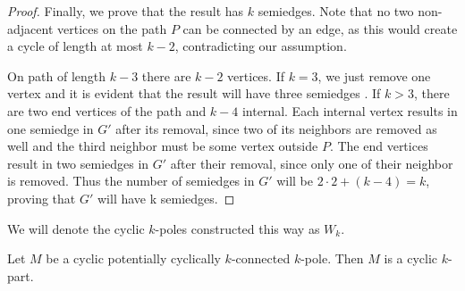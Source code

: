 \documentclass[12pt, twoside]{book}
\begin{document}
\begin{proof}
	Finally, we prove that the result has $k$ semiedges. Note that no two non-adjacent vertices on the path $P$ can be connected by an edge, as this would create a cycle of length at most $k-2$, contradicting our assumption.
	
	On path of length $k-3$ there are $k-2$ vertices. If $k=3$, we just remove one vertex and it is evident that the result will have three semiedges . If $k > 3$, there are two end vertices of the path and $k-4$ internal. Each internal vertex results in one semiedge in $G'$ after its removal, since two of its neighbors are removed as well and the third neighbor must be some vertex outside $P$. The end vertices result in two semiedges in $G'$ after their removal, since only one of their neighbor is removed. Thus the number of semiedges in $G'$ will be $2\cdot 2 + (k-4)=k$, proving that $G'$ will have k semiedges.
\end{proof}

We will denote the cyclic $k$-poles constructed this way as $W_k$.

\begin{theorem}\label{th:alternative-definition-of-cyclic-part}
	Let $M$ be a cyclic potentially cyclically $k$-connected $k$-pole. Then $M$ is a cyclic $k$-part.
\end{theorem}
\end{document}
